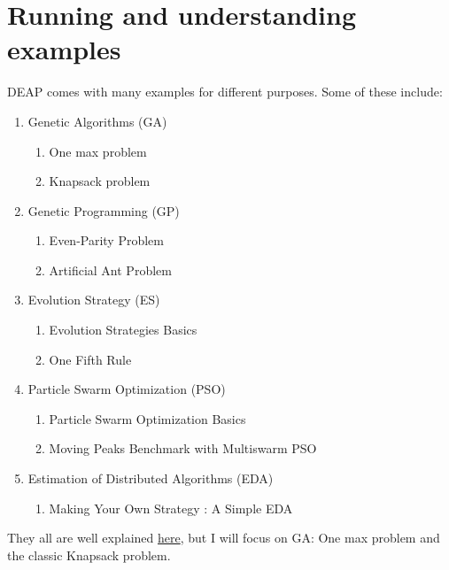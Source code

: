 \documentclass[a4paper,12pt]{report}
\begin{document}
\chapter{Running and understanding examples}

DEAP comes with many examples for different purposes. Some of these include:
\begin{enumerate}
\item Genetic Algorithms (GA)
\begin{enumerate}
\item One max problem
\item Knapsack problem
\end{enumerate}
\item Genetic Programming (GP)
\begin{enumerate}
\item Even-Parity Problem
\item Artificial Ant Problem
\end{enumerate}
\item Evolution Strategy (ES)
\begin{enumerate}
\item Evolution Strategies Basics
\item One Fifth Rule
\end{enumerate}
\item Particle Swarm Optimization (PSO)
\begin{enumerate}
\item Particle Swarm Optimization Basics
\item Moving Peaks Benchmark with Multiswarm PSO
\end{enumerate}
\item Estimation of Distributed Algorithms (EDA)
\begin{enumerate}
\item Making Your Own Strategy : A Simple EDA
\end{enumerate}
\end{enumerate}

They all are well explained \href{https://deap.readthedocs.io/en/master/examples/index.html}{here}, but I will focus on GA: One max problem and the classic Knapsack problem.
\end{document}
